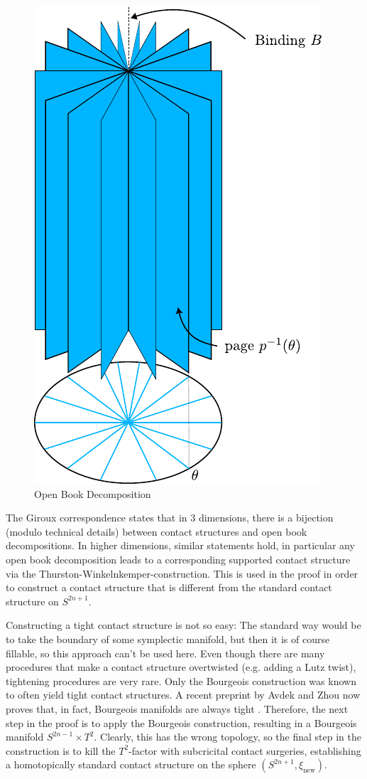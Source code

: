 \begin{figure}
    \includegraphics{images/open_book.pdf}
    \caption{Open Book Decomposition}
    \label{fig:open_book}
\end{figure}

The Giroux correspondence states that in 3 dimensions, there is a bijection (modulo technical details) between contact structures
and open book decompositions.
In higher dimensions, similar statements hold, in particular any open book decomposition leads to a corresponding supported
contact structure via the Thurston-Winkelnkemper-construction.
This is used in the proof in order to construct a contact structure that is different from the standard contact structure on $S^{2n+1}$.

Constructing a tight contact structure is not so easy: The standard way would be to take the boundary of some symplectic manifold,
but then it is of course fillable, so this approach can't be used here.
Even though there are many procedures that make a contact structure overtwisted (e.g. adding a Lutz twist), tightening procedures are very rare.
Only the Bourgeois construction was known to often yield tight contact structures. 
A recent preprint by Avdek and Zhou now proves that, in fact, Bourgeois manifolds are always tight \cite{AZ24}.
Therefore, the next step in the proof is to apply the Bourgeois construction, resulting in a Bourgeois manifold $S^{2n-1} \times T^2$.
Clearly, this has the wrong topology, so the final step in the construction is to kill the $T^2$-factor with
subcricital contact surgeries, establishing a homotopically standard contact structure on the sphere $(S^{2n+1},\xi_\text{new})$.

